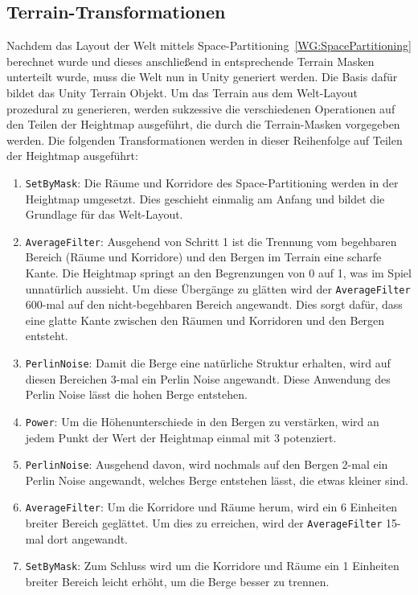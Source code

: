 \subsection{Terrain-Transformationen}
Nachdem das Layout der Welt mittels Space-Partitioning~\ref{WG:SpacePartitioning} berechnet wurde und dieses anschließend in entsprechende Terrain Masken unterteilt wurde, muss die Welt nun in Unity generiert werden.
Die Basis dafür bildet das Unity Terrain Objekt.
Um das Terrain aus dem Welt-Layout prozedural zu generieren, werden sukzessive die verschiedenen Operationen auf den Teilen der Heightmap ausgeführt, die durch die Terrain-Masken vorgegeben werden.
Die folgenden Transformationen werden in dieser Reihenfolge auf Teilen der Heightmap ausgeführt:
\begin{enumerate}
    \item \texttt{SetByMask}: Die Räume und Korridore des Space-Partitioning werden in der Heightmap umgesetzt. Dies geschieht einmalig am Anfang und bildet die Grundlage für das Welt-Layout. %
    \item \texttt{AverageFilter}: Ausgehend von Schritt 1 ist die Trennung vom begehbaren Bereich (Räume und Korridore) und den Bergen im Terrain eine scharfe Kante.
          Die Heightmap springt an den Begrenzungen von 0 auf 1, was im Spiel unnatürlich aussieht.
          Um diese Übergänge zu glätten wird der \texttt{AverageFilter} 600-mal auf den nicht-begehbaren Bereich angewandt.
          Dies sorgt dafür, dass eine glatte Kante zwischen den Räumen und Korridoren und den Bergen entsteht.
    \item \texttt{PerlinNoise}: Damit die Berge eine natürliche Struktur erhalten, wird auf diesen Bereichen 3-mal ein Perlin Noise angewandt.
          Diese Anwendung des Perlin Noise lässt die hohen Berge entstehen.
    \item \texttt{Power}: Um die Höhenunterschiede in den Bergen zu verstärken, wird an jedem Punkt der Wert der Heightmap einmal mit $3$ potenziert.
    \item \texttt{PerlinNoise}: Ausgehend davon, wird nochmals auf den Bergen 2-mal ein Perlin Noise angewandt, welches Berge entstehen lässt, die etwas kleiner sind.
    \item \texttt{AverageFilter}: Um die Korridore und Räume herum, wird ein 6 Einheiten breiter Bereich geglättet.
          Um dies zu erreichen, wird der \texttt{AverageFilter} 15-mal dort angewandt.
    \item \texttt{SetByMask}: Zum Schluss wird um die Korridore und Räume ein 1 Einheiten breiter Bereich leicht erhöht, um die Berge besser zu trennen.
\end{enumerate}

